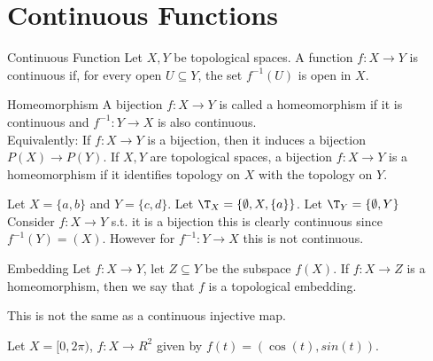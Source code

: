 \section{Continuous Functions}
\begin{definition}{Continuous Function}{}
    Let $X,Y$ be topological spaces. A function $f: X \to Y$ is continuous if,
    for every open $U \subseteq Y$, the set $f^{-1}(U)$ is open in $X$.
\end{definition}

\begin{definition}{Homeomorphism}{}
    A bijection $f: X \to Y$ is called a homeomorphism if it is continuous and $f^{-1}: Y \to X$ is also continuous.\\
    Equivalently: If $f: X \to Y$ is a bijection, then it induces a bijection $P(X) \to P(Y)$. If $X,Y$ are topological spaces, a bijection $f:X \to Y$ is a homeomorphism if it identifies topology on $X$ with the topology on $Y$.
\end{definition}

\begin{example*}{}{}
    Let $X=\{a,b\}$ and $Y=\{c,d\}$. Let $\T_X=\{\emptyset, X, \{a\}\}$. Let $\T_Y=\{\emptyset, Y\}$\\
    Consider $f: X \to Y$ s.t. it is a bijection this is clearly continuous since $f^{-1}(Y)=(X)$. However for $f^{-1} : Y \to X$ this is not continuous.
\end{example*}

\begin{definition}{Embedding}{}
    Let $f: X \to Y$, let $Z \subseteq Y$ be the subspace $f(X)$. If $f:X \to Z$ is a homeomorphism, then we say that $f$ is a topological embedding.
\end{definition}
This is not the same as a continuous injective map.
\begin{example*}{}{}
    Let $X=[0,2\pi)$, $f: X \to R^2$ given by $f(t)=(\cos(t),sin(t))$.
\end{example*}

